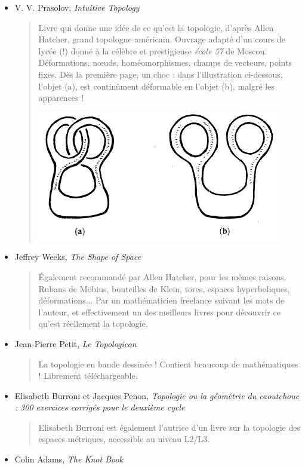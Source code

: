\documentclass{article}
\begin{document}
\begin{itemize}
\item V. V. Prasolov, \emph{Intuitive Topology}
\begin{quote}
Livre qui \og donne une idée de ce qu'est la topologie\fg, d'après Allen Hatcher, grand topologue américain.  Ouvrage adapté d'un cours de lycée (!) donné à la célèbre et prestigieuse  \emph{école 57} de Moscou. Déformations, n\oe uds, homéomorphismes, champs de vecteurs, points fixes. Dès la première page, un choc : dans l'illustration ci-dessous, l'objet (a), est continûment déformable en l'objet (b), malgré les apparences !
\begin{center}
\includegraphics[scale=.6]{enlacement}
\end{center}
\end{quote}
\item Jeffrey Weeks, \emph{The Shape of Space}
\begin{quote}
Également recommandé par Allen Hatcher, pour les mêmes raisons. Rubans de Möbius, bouteilles de Klein, tores, espaces hyperboliques, déformations... Par un \og mathématicien freelance\fg{} suivant les mots de l'auteur, et effectivement un des meilleurs livres pour découvrir ce qu'est réellement la topologie.
\end{quote}
\item Jean-Pierre Petit, \emph{Le Topologicon}
\begin{quote}
La topologie en bande dessinée ! Contient beaucoup de mathématiques ! Librement téléchargeable. 
\end{quote}
\item  Elisabeth Burroni et Jacques Penon, \emph{Topologie ou la géométrie du caoutchouc : 300 exercices corrigés pour le deuxième cycle}
\begin{quote}
Elisabeth Burroni est également l'autrice d'un livre sur la topologie des espaces métriques, accessible au niveau L2/L3.
\end{quote}
\item Colin Adams, \emph{The Knot Book}

\end{itemize}
\end{document}
